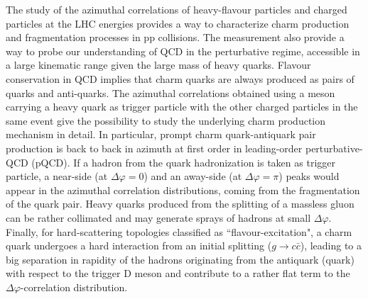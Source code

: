
The study of the azimuthal correlations of heavy-flavour particles and charged particles at the LHC energies provides a way to characterize charm production and fragmentation processes in pp collisions. The measurement also provide a way to probe our understanding of QCD in the perturbative regime, accessible in a large kinematic range given the large mass of heavy quarks. Flavour conservation in QCD implies that charm quarks are always produced as pairs of quarks and anti-quarks. The azimuthal correlations obtained using a meson carrying a heavy quark as trigger particle with the other charged particles in the same event give the possibility to study the underlying charm production mechanism in detail. In particular, prompt charm quark-antiquark pair production is back to back in azimuth at first order in leading-order perturbative-QCD (pQCD). If a hadron from the quark hadronization is taken as trigger particle, a near-side (at $\Delta\varphi = 0$) and an away-side (at $\Delta\varphi = \pi$) peaks would appear in the azimuthal correlation distributions, coming from the fragmentation of the quark pair. Heavy quarks produced from the splitting of a massless gluon can be rather collimated and may generate sprays of hadrons at small $\Delta\varphi$. Finally, for hard-scattering topologies classified as ``flavour-excitation", a charm quark undergoes a hard interaction from an initial splitting ($g\to c\bar{c}$), leading to a big separation in rapidity of the hadrons originating from the antiquark (quark) with respect to the trigger D meson and contribute to a rather flat term to the $\Delta\varphi$-correlation distribution.



